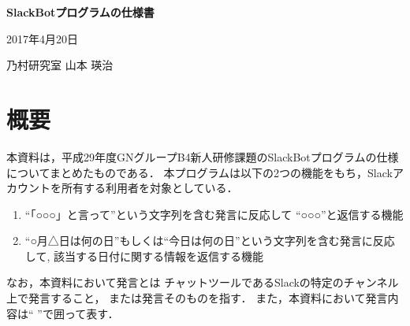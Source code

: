 \documentclass[fleqn, 14pt]{extarticlej}
\begin{document}
\begin{center}
  {\Large {\bf SlackBotプログラムの仕様書}}

\end{center}
\begin{flushright}
  2017年4月20日

  乃村研究室 山本 瑛治
\end{flushright}


\section{概要}
本資料は，平成29年度GNグループB4新人研修課題のSlackBotプログラムの仕様
についてまとめたものである．
本プログラムは以下の2つの機能をもち，Slack\cite{Slack}アカウントを所有する利用者を対象としている．
\begin{enumerate}
\item ``「○○○」と言って''という文字列を含む発言に反応して ``○○○''と返信する機能
\item ``○月△日は何の日''もしくは``今日は何の日''という文字列を含む発言に反応して, 
  該当する日付に関する情報を返信する機能
\end{enumerate}
なお，本資料において発言とは
チャットツールであるSlackの特定のチャンネル上で発言すること，
または発言そのものを指す．
また，本資料において発言内容は`` ''で囲って表す．



\end{document}
